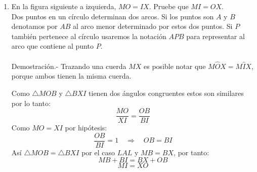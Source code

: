 \documentclass[10pt]{article}
\begin{document}
\begin{enumerate}
\item En la figura siguiente a izquierda, $MO = IX$. Pruebe que $MI = OX$.\\
Dos puntos en un círculo determinan dos arcos. Si los puntos son $A$ y $B$ denotamos por $AB$ al arco menor determinado por estos dos puntos. Si $P$ también pertenece al círculo usaremos la notación $APB$ para representar al arco que contiene al punto $P$.\\\\
    Demostración.-\; Trazando una cuerda $MX$ es posible notar que $M\widehat{O}X = M\widehat{I}X$, porque ambos tienen la misma cuerda.
    \begin{center}
    \end{center}
    Como $\triangle MOB$ y $\triangle BXI$ tienen dos ángulos congruentes estos son similares por lo tanto: $$\dfrac{MO}{XI}=\dfrac{OB}{BI}$$
    Como $MO=XI$ por hipótesis: $$\dfrac{OB}{BI} = 1 \quad \Rightarrow \quad OB=BI$$
    Así $\triangle MOB = \triangle BXI$ por el caso $LAL$ y $MB=BX$, por tanto:
    $$MB+BI=BX+OB$$ $$MI=XO$$\\


\end{enumerate}
\end{document}
